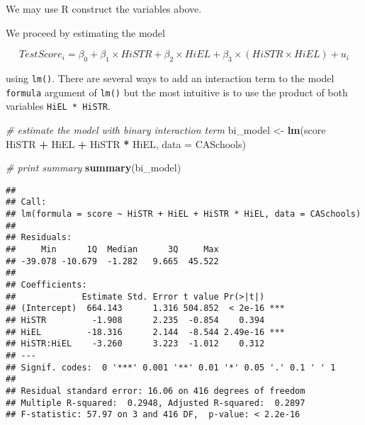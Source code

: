 \documentclass[]{book}
\newenvironment{Shaded}{\begin{snugshade}}{\end{snugshade}}
\newcommand{\KeywordTok}[1]{\textcolor[rgb]{0.13,0.29,0.53}{\textbf{#1}}}
\newcommand{\DataTypeTok}[1]{\textcolor[rgb]{0.13,0.29,0.53}{#1}}
\newcommand{\DecValTok}[1]{\textcolor[rgb]{0.00,0.00,0.81}{#1}}
\newcommand{\StringTok}[1]{\textcolor[rgb]{0.31,0.60,0.02}{#1}}
\newcommand{\CommentTok}[1]{\textcolor[rgb]{0.56,0.35,0.01}{\textit{#1}}}
\newcommand{\OperatorTok}[1]{\textcolor[rgb]{0.81,0.36,0.00}{\textbf{#1}}}
\newcommand{\NormalTok}[1]{#1}
\theoremstyle{definition}
\theoremstyle{definition}
\theoremstyle{definition}
\theoremstyle{remark}
\begin{document}
We may use R construct the variables above.

\begin{Shaded}
\end{Shaded}

We proceed by estimating the model

\[ TestScore_i = \beta_0 + \beta_1 \times HiSTR + \beta_2 \times HiEL + \beta_3 \times (HiSTR \times HiEL) + u_i \]

using \texttt{lm()}. There are several ways to add an interaction term
to the model \texttt{formula} argument of \texttt{lm()} but the most
intuitive is to use the product of both variables
\texttt{HiEL\ *\ HiSTR}.

\begin{Shaded}
\begin{Highlighting}[]
\CommentTok{# estimate the model with binary interaction term}
\NormalTok{bi_model <-}\StringTok{ }\KeywordTok{lm}\NormalTok{(score }\OperatorTok{~}\StringTok{ }\NormalTok{HiSTR }\OperatorTok{+}\StringTok{ }\NormalTok{HiEL }\OperatorTok{+}\StringTok{ }\NormalTok{HiSTR }\OperatorTok{*}\StringTok{ }\NormalTok{HiEL, }\DataTypeTok{data =}\NormalTok{ CASchools)}

\CommentTok{# print summary}
\KeywordTok{summary}\NormalTok{(bi_model)}
\end{Highlighting}
\end{Shaded}

\begin{verbatim}
## 
## Call:
## lm(formula = score ~ HiSTR + HiEL + HiSTR * HiEL, data = CASchools)
## 
## Residuals:
##     Min      1Q  Median      3Q     Max 
## -39.078 -10.679  -1.282   9.665  45.522 
## 
## Coefficients:
##             Estimate Std. Error t value Pr(>|t|)    
## (Intercept)  664.143      1.316 504.852  < 2e-16 ***
## HiSTR         -1.908      2.235  -0.854    0.394    
## HiEL         -18.316      2.144  -8.544 2.49e-16 ***
## HiSTR:HiEL    -3.260      3.223  -1.012    0.312    
## ---
## Signif. codes:  0 '***' 0.001 '**' 0.01 '*' 0.05 '.' 0.1 ' ' 1
## 
## Residual standard error: 16.06 on 416 degrees of freedom
## Multiple R-squared:  0.2948, Adjusted R-squared:  0.2897 
## F-statistic: 57.97 on 3 and 416 DF,  p-value: < 2.2e-16
\end{verbatim}
\end{document}
